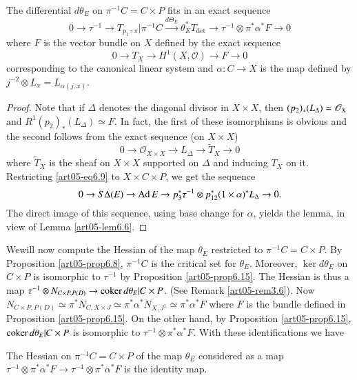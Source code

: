 \begin{proposition}\label{art05-prop6.15}
The differential $d\theta_{E}$ on $\pi^{-1}C=C\times P$ fits in an
exact sequence
$$
0\to \tau^{-1}\to
T_{p_{1}\circ \pi}|\pi^{-1}C\xrightarrow{d\Theta_{E}}\theta^{*}_{E}T_{\det}\to \tau^{-1}\otimes \pi^{*}\alpha^{*}F\to 0
$$
where $F$ is the vector bundle on $X$ defined by the exact sequence
$$
0\to T_{X}\to H^{1}(X,\mathscr{O})\to F\to 0
$$
corresponding to the canonical linear system and $\alpha:C\to X$ is
the map defined by $j^{-2}\otimes L_{x}=L_{\alpha(j,x)}$.
\end{proposition}

\begin{proof}
Note that if $\Delta$ denotes the diagonal divisor in $X\times X$,
then $(p_{2})_{*}(L_{\Delta})\\\simeq\mathscr{O}_{X}$ and
$R^{1}(p_{2})_{*}(L_{\Delta})\simeq F$. In fact, the first of these
isomorphisms is obvious and the second follows from the exact sequence
(on $X\times X$)
$$
0\to \mathscr{O}_{X\times X}\to L_{\Delta}\to \widetilde{T}_{X}\to 0
$$
where $\widetilde{T}_{X}$ is the sheaf on $X\times X$ supported on
$\Delta$ and inducing $T_{X}$ on it. Restricting \ref{art05-eq6.9} to
$X\times C\times P$, we get the sequence
$$
0\to S\Delta(E)\to \operatorname{Ad} E\to p^{*}_{3}\tau^{-1}\otimes
p^{*}_{12}(1\times \alpha)^{*}L_{\Delta}\to 0.
$$
The direct image of this sequence, using base change for $\alpha$,
yields the lemma, in view of Lemma \ref{art05-lem6.6}.

\end{proof}

We\pageoriginale will now compute the Hessian of the map $\theta_{E}$
restricted to $\pi^{-1}C=C\times P$. By
Proposition \ref{art05-prop6.8}, $\pi^{-1}C$ is the critical set for
$\theta_{E}$. Moreover, $\ker d\theta_{E}$ on $C\times P$ is
isomorphic to $\tau^{-1}$ by Proposition \ref{art05-prop6.15}. The
Hessian is thus a map $\tau^{-1}\otimes N_{C\times P,P(D)}\to \operatorname{coker}
d\theta_{E}|C\times P$. (See Remark \ref{art05-rem3.6}). Now
$N_{C\times P,P(D)}\simeq \pi^{*}N_{C,X\times
J}\simeq \pi^{*}\alpha^{*}N_{X,J^{1}}\simeq \pi^{*}\alpha^{*}F$ where
$F$ is the bundle defined in Proposition \ref{art05-prop6.15}. On the
other hand, by Proposition \ref{art05-prop6.15}, $\operatorname{coker}
d\theta_{E}|C\times P$ is isomorphic to
$\tau^{-1}\otimes \pi^{*}\alpha^{*}F$. With these identifications we have


\begin{proposition}\label{art05-prop6.16}
The Hessian on $\pi^{-1}C=C\times P$ of the map $\theta_{E}$
considered as a map
$\tau^{-1}\otimes \pi^{*}\alpha^{*}F\to \tau^{-1}\otimes \pi^{*}\alpha^{*}F$
is the identity map.
\end{proposition}

